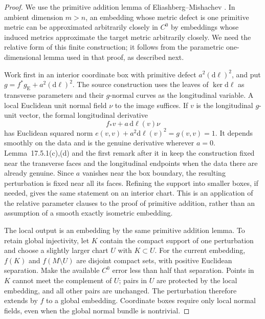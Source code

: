 \documentclass[11pt]{article}
\theoremstyle{remark}
\begin{document}
\begin{proof}
We use the primitive addition lemma of Eliashberg--Mishachev
\cite[Lemma~21.6.1, pp.~196--197]{EM}. In ambient dimension $m>n$,
an embedding whose metric defect is one primitive metric can be
approximated arbitrarily closely in $C^0$ by embeddings whose induced
metrics approximate the target metric arbitrarily closely. We need the
relative form of this finite construction; it follows from the
parametric one-dimensional lemma used in that proof, as described next.

Work first in an interior coordinate box with primitive defect
$a^2(\mathrm d\ell)^2$, and put
$g=f^*g_{\mathrm E}+a^2(\mathrm d\ell)^2$. The source construction uses the
leaves of $\ker\mathrm d\ell$ as transverse parameters and their
$g$-normal curves as the longitudinal variable. A local Euclidean unit
normal field $\nu$ to the image suffices. If $v$ is the longitudinal
$g$-unit vector, the formal longitudinal derivative
\[
 f_*v+a\,\mathrm d\ell(v)\nu
\]
has Euclidean squared norm
$e(v,v)+a^2\mathrm d\ell(v)^2=g(v,v)=1$. It depends smoothly on the data
and is the genuine derivative wherever $a=0$.
Lemma~17.5.1(c),(d) and the first remark after it in \cite[pp.~161--162]{EM}
keep the construction fixed near the transverse faces and the longitudinal
endpoints when the data there are already genuine. Since $a$ vanishes
near the box boundary, the resulting perturbation is fixed near all its
faces. Refining the support into smaller boxes, if needed, gives the
same statement on an interior chart. This is an application of the
relative parameter clauses to the proof of primitive addition, rather
than an assumption of a smooth exactly isometric embedding.

The local output is an embedding by the same primitive addition lemma.
To retain global injectivity, let $K$ contain the compact support of one
perturbation and choose a slightly larger chart $U$ with $K\subset U$.
For the current embedding, $f(K)$ and $f(M\setminus U)$ are disjoint
compact sets, with positive Euclidean separation. Make the available
$C^0$ error less than half that separation. Points in $K$ cannot meet
the complement of $U$; pairs in $U$ are protected by the local embedding,
and all other pairs are unchanged. The perturbation therefore extends
by $f$ to a global embedding. Coordinate boxes require only local normal
fields, even when the global normal bundle is nontrivial.


\end{proof}
\end{document}
